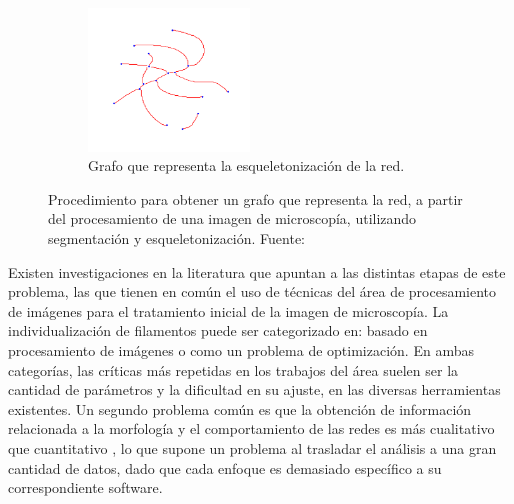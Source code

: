 \begin{figure}[h!]
    ~ 
    \begin{subfigure}[t]{0.5\textwidth}
        \centering
        \includegraphics[height=1.5in]{imagenes/graph_of_skel_no_axis.png}
        \caption{Grafo que representa la esqueletonizaci\'on de la red.}
        \label{Fig1d}
    \end{subfigure}
    \caption{Procedimiento para obtener un grafo que representa la red, a partir del procesamiento de una imagen de microscop\'ia, utilizando segmentaci\'on y esqueletonizaci\'on. Fuente: \cite{breuer2015define}}
\end{figure}

Existen investigaciones en la literatura que apuntan a las distintas etapas de este problema, las que tienen en com\'un el uso de t\'ecnicas del \'area de procesamiento de im\'agenes para el tratamiento inicial de la imagen de microscop\'ia. La individualizaci\'on de filamentos puede ser categorizado en: basado en procesamiento de im\'agenes o como un problema de optimizaci\'on. 
En ambas categor\'ias, las cr\'iticas m\'as repetidas en los trabajos del \'area suelen ser la cantidad de par\'ametros y la dificultad en su ajuste, en las diversas herramientas existentes. Un segundo problema com\'un es que la obtenci\'on de informaci\'on relacionada a la morfolog\'ia y el comportamiento de las redes es m\'as cualitativo que cuantitativo \cite{asgharzadeh2018computational}\cite{qiu2014quantitative}, lo que supone un problema al trasladar el  an\'alisis a una gran cantidad de datos, dado que cada enfoque es demasiado espec\'ifico a su correspondiente software.

